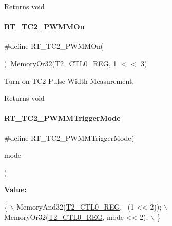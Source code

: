 \begin{DoxyReturn}{Returns}
void 
\end{DoxyReturn}
\mbox{\label{a00047_a37ffb0b466d2a13bb9917a818b06776b}} 
\paragraph{\texorpdfstring{R\+T\+\_\+\+T\+C2\+\_\+\+P\+W\+M\+M\+On}{RT\_TC2\_PWMMOn}}
{\footnotesize\ttfamily \#define R\+T\+\_\+\+T\+C2\+\_\+\+P\+W\+M\+M\+On(\begin{DoxyParamCaption}{ }\end{DoxyParamCaption})~\mbox{\hyperlink{a00020_a27874a97deab7cecdde5ddecf466e31e}{Memory\+Or32}}(\mbox{\hyperlink{a00020_adadaa0ab1ebbd7ba9b70dfd24c3ed44daf2e9deb36631241181cbf09e8d959475}{T2\+\_\+\+C\+T\+L0\+\_\+\+R\+EG}}, 1 $<$$<$ 3)}



Turn on T\+C2 Pulse Width Measurement. 

\begin{DoxyReturn}{Returns}
void 
\end{DoxyReturn}
\mbox{\label{a00047_a80f5ade258504a1243ccb058dd860475}} 
\paragraph{\texorpdfstring{R\+T\+\_\+\+T\+C2\+\_\+\+P\+W\+M\+M\+Trigger\+Mode}{RT\_TC2\_PWMMTriggerMode}}
{\footnotesize\ttfamily \#define R\+T\+\_\+\+T\+C2\+\_\+\+P\+W\+M\+M\+Trigger\+Mode(\begin{DoxyParamCaption}\item[{}]{mode }\end{DoxyParamCaption})}

{\bfseries Value\+:}
\begin{DoxyCode}
\{                                        \(\backslash\)
        MemoryAnd32(\mbox{\hyperlink{a00020_adadaa0ab1ebbd7ba9b70dfd24c3ed44daf2e9deb36631241181cbf09e8d959475}{T2\_CTL0\_REG}}, ~(1 << 2)); \(\backslash\)
        MemoryOr32(\mbox{\hyperlink{a00020_adadaa0ab1ebbd7ba9b70dfd24c3ed44daf2e9deb36631241181cbf09e8d959475}{T2\_CTL0\_REG}}, mode << 2);  \(\backslash\)
    \}
\end{DoxyCode}


